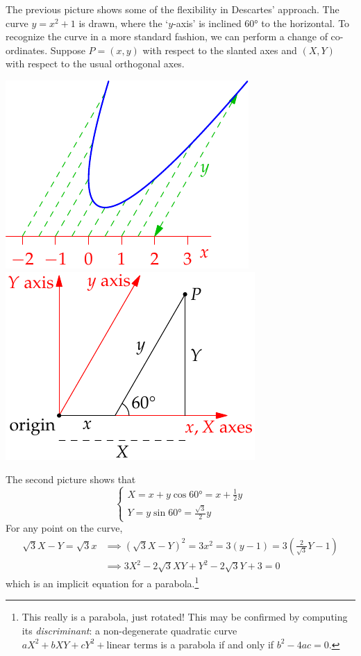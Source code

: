  The previous picture shows some of the flexibility in Descartes' approach. The curve $y=x^2+1$ is drawn, where the `$y$-axis' is inclined \ang{60} to the horizontal. To recognize the curve in a more standard fashion, we can perform a change of co-ordinates. Suppose $P=(x,y)$ with respect to the slanted axes and $(X,Y)$ with respect to the usual orthogonal axes.
\begin{center}
	\includegraphics{analytic-parab}
	\qquad\qquad
	\includegraphics{analytic-parab2}
\end{center}
The second picture shows that
\[
	\begin{cases}
		X=x+y\cos \ang{60}=x+\frac 12y \\
		Y=y\sin \ang{60}=\frac{\sqrt 3}2y
	\end{cases}
\]
For any point on the curve,
\begin{align*}
	\sqrt 3X-Y=\sqrt 3x&\implies (\sqrt 3X-Y)^2=3x^2=3(y-1)=3\left(\frac 2{\sqrt 3}Y-1\right)\\
	&\implies 3X^2-2\sqrt 3 XY+Y^2-2\sqrt 3Y+3=0
\end{align*}
which is an implicit equation for a parabola.\footnote{%
	This really is a parabola, just rotated! This may be confirmed by computing its \emph{discriminant}: a non-degenerate quadratic curve $aX^2+bXY+cY^2+\text{linear terms}$ is a parabola if and only if $b^2-4ac=0$.
}


